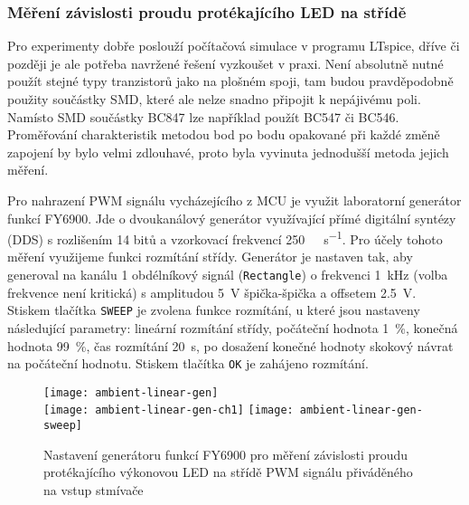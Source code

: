 \subsubsection{Měření závislosti proudu protékajícího LED na střídě}
Pro experimenty dobře poslouží počítačová simulace v programu
LTspice, dříve či později je ale potřeba navržené řešení vyzkoušet v praxi.
Není absolutně nutné použít stejné typy tranzistorů jako na plošném spoji, tam
budou pravděpodobně použity součástky SMD, které ale nelze snadno připojit
k nepájivému poli. Namísto SMD součástky BC847 lze například použít BC547 či
BC546. Proměřování charakteristik metodou bod po bodu opakované při každé změně
zapojení by bylo velmi zdlouhavé, proto byla vyvinuta jednodušší metoda jejich
měření.

Pro nahrazení PWM signálu vycházejícího z MCU je využit laboratorní generátor
funkcí FY6900. Jde o dvoukanálový generátor využívající přímé digitální syntézy
(DDS) s rozlišením 14 bitů a vzorkovací frekvencí
\SI{250}{\mega\sample\per\second}. Pro účely tohoto měření využijeme funkci
rozmítání střídy. Generátor je nastaven tak, aby generoval na kanálu 1
obdélníkový signál (\texttt{Rectangle}) o frekvenci \SI{1}{\kilo\hertz} (volba
frekvence není kritická) s amplitudou \SI{5}{\volt} špička-špička a offsetem
\SI{2,5}{\volt}. Stiskem tlačítka \texttt{SWEEP} je zvolena funkce rozmítání,
u které jsou nastaveny následující parametry: lineární rozmítání střídy,
počáteční hodnota \SI{1}{\percent}, konečná hodnota \SI{99}{\percent}, čas
rozmítání \SI{20}{\second}, po dosažení konečné hodnoty skokový návrat na
počáteční hodnotu.
Stiskem tlačítka \texttt{OK} je zahájeno rozmítání.

\begin{figure}[htb]
    \centering
    \texttt{[image: ambient-linear-gen]}
    \\ \vspace{5mm}
    \texttt{[image: ambient-linear-gen-ch1]}
    \hfill
    \texttt{[image: ambient-linear-gen-sweep]}
    \caption{%
        Nastavení generátoru funkcí FY6900 pro měření závislosti proudu
        protékajícího výkonovou LED na střídě PWM signálu přiváděného na vstup
        stmívače
    }
    \label{fig:ambient linear mereni generator}
\end{figure}

